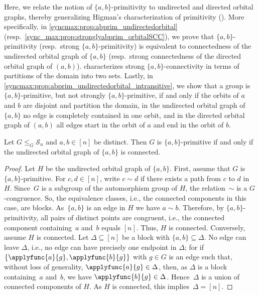 
Here, we relate the notion of $\{a,b\}$-primitivity
to undirected and directed orbital graphs, thereby 
generalizing Higman's characterization of primitivity ().
More specifically, in \cref{syncmax:prop:abprim_undirectedorbital} (resp.~\cref{sync_max:prop:stronglyabprim_orbitalSCC}),
we prove that $\{a,b\}$-primitivity (resp.~strong $\{a,b\}$-primitivity)
is equivalent to connectedness of the undirected orbital graph of $\{a,b\}$  (resp.~strong connectedness of the directed orbital graph of $(a,b)$).
characterizes strong $\{a,b\}$-connectivity
in terms of partitions of the domain into two sets.
Lastly, in \cref{syncmax:prop:abprim_undirectedorbital_intransitive},
we show that a group is $\{a,b\}$-primitive, but
not strongly $\{a,b\}$-primitive,
if and only if the orbits of $a$ and $b$
are disjoint and partition the domain, in the undirected orbital graph of $\{a,b\}$ no edge is completely contained
in one orbit, and in the directed orbital graph of $(a,b)$
all edges start in the orbit of $a$ and end in the orbit of $b$.

\begin{proposition}
	\label{syncmax:prop:abprim_undirectedorbital}
	Let $G \le_G \mathcal S_n$ and $a,b \in [n]$ be distinct.
	Then $G$ is $\{a,b\}$-primitive if and only if 
	the undirected orbital graph of $\{a,b\}$ is connected.
\end{proposition}
\begin{proof}	
	Let $H$ be the undirected orbital graph of $\{a,b\}$.	
	First, assume that $G$ is $\{a,b\}$-primitive.	
	For $c,d \in [n]$, write $c \sim d$ 
	if there exists a path from $c$ to $d$ in $H$.
	Since~$G$ is a subgroup of the automorphism group of $H$, the relation~$\sim$ is a $G$-congruence.
	So, the equivalence classes, i.e., the connected components
	in this case, are blocks.		
	As~$\{a,b\}$ is an edge in $H$ we have $a \sim b$.
	Therefore, by $\{a,b\}$-primitivity,
	all pairs of distinct points
	are congruent, i.e., the connected component
	containing~$a$ and~$b$ equals $[n]$. Thus, $H$ is connected.
	Conversely, assume $H$ is connected.
	Let $\Delta \subseteq [n]$ be a block with $\{a,b\} \subseteq \Delta$.
	No edge can leave $\Delta$, i.e., no edge can have precisely one
	endpoint in $\Delta$; for if $\{ \applyfunc{a}{g}, \applyfunc{b}{g} \}$ with $g \in G$
	is an edge such that, without loss of generality, $\applyfunc{a}{g} \in \Delta$,
	then, as $\Delta$ is a block containing~$a$ and~$b$, we have $\applyfunc{b}{g} \in \Delta$. 
	Hence~$\Delta$ is a union of connected components of $H$. As $H$ is
	connected, this implies~$\Delta = [n]$.
\end{proof}


